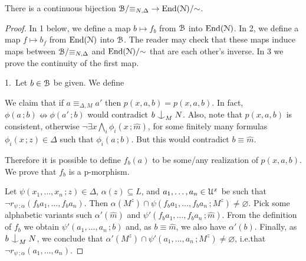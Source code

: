 \begin{fact}
  There is a continuous bijection $\EuScript B/{\equiv_{N,\Delta}}\to{\rm End}(\EuScript N)/{\sim}$.
\end{fact}

\begin{proof}
  In 1 below, we define a map $b\mapsto f_b$ from $\EuScript B$ into ${\rm End}(\EuScript N)$. In 2, we define a map $f\mapsto b_f$ from ${\rm End}(\EuScript N)$ into $\EuScript B$.
  The reader may check that these maps induce maps between $\EuScript B/{\equiv_{N,\Delta}}$ and ${\rm End}(\EuScript N)/{\sim}$ that are each other's inverse.
  In 3 we prove the continuity of the first map.

  1.\ 
  Let $b\in\EuScript B$ be given.
  We define
  

  We claim that if $a\equiv_{\Delta,M}a'$ then $p(x,a,b)=p(x,a,b)$.
  In fact, $\phi(a\,;b)\nleftrightarrow\phi(a'\,;b)$ would contradict $b\nonfork_MN$.
  Also, note that $p(x,a,b)$ is consistent, otherwise $\neg\exists x\bigwedge_i\phi_i(x\,;\hat m)$, for some finitely many formulas $\phi_i(x\,;z)\in\Delta$ such that $\phi_i(a\,;b)$.
  But this would contradict $b\equiv\hat m$.

  Therefore it is possible to define $f_b(a)$ to be some/any realization of $p(x,a,b)$.
  We prove that $f_b$ is a p-morphism.

  Let $\psi(x_1,\dots,x_n\,;z)\in\Delta$, $\alpha(z)\subseteq L$, and $a_1,\dots,a_n\in\EuScript U^x$ be such that $\neg r_{\psi\,;\alpha}(f_ba_1,\dots,f_ba_n)$.
  Then $\alpha(M^z)\cap\psi(f_ba_1,\dots,f_ba_n\,;M^z)\neq\varnothing$.
  Pick some alphabetic variants such $\alpha'(\hat m)$ and $\psi'(f_ba_1,\dots,f_ba_n\,;\hat m)$.
  From the definition of $f_b$ we obtain $\psi'(a_1,\dots,a_n\,;b)$ and, as $b\equiv\hat m$, we also have $\alpha'(b)$.
  Finally, as $b\nonfork_MN$, we conclude that $\alpha'(M^z)\cap\psi'(a_1,\dots,a_n\,;M^z)\neq\varnothing$, i.e.\@ that $\neg r_{\psi\,;\alpha}(a_1,\dots,a_n)$.
  
  
  




\end{proof}
